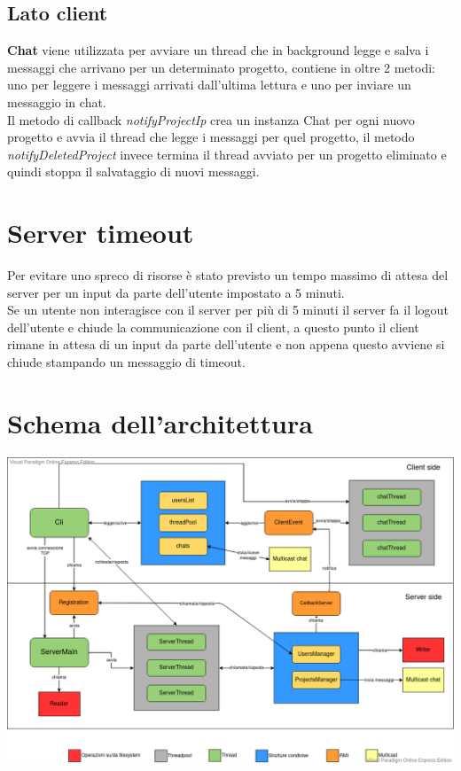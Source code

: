 \documentclass[11pt]{report}
\begin{document}
	\subsection{Lato client}
	\textbf{Chat} viene utilizzata per avviare un thread che in background legge e salva i messaggi che arrivano per un determinato progetto, contiene in oltre 2 metodi: uno per leggere i messaggi arrivati dall'ultima lettura e uno per inviare un messaggio in chat. \\
	Il metodo di callback \textit{notifyProjectIp} crea un instanza Chat per ogni nuovo progetto e avvia il thread che legge i messaggi per quel progetto, il metodo \textit{notifyDeletedProject} invece termina il thread avviato per un progetto eliminato e quindi stoppa il salvataggio di nuovi messaggi.
	
	\section{Server timeout}
	Per evitare uno spreco di risorse è stato previsto un tempo massimo di attesa del server per un input da parte dell'utente impostato a 5 minuti. \\
	Se un utente non interagisce con il server per più di 5 minuti il server fa il logout dell'utente e chiude la communicazione con il client, a questo punto il client rimane in attesa di un input da parte dell'utente e non appena questo avviene si chiude stampando un messaggio di timeout. \\
	
	\section{Schema dell'architettura}
	\begin{center}
		\includegraphics[width=1\textwidth]{project-architecture}
	\end{center}
\end{document}

